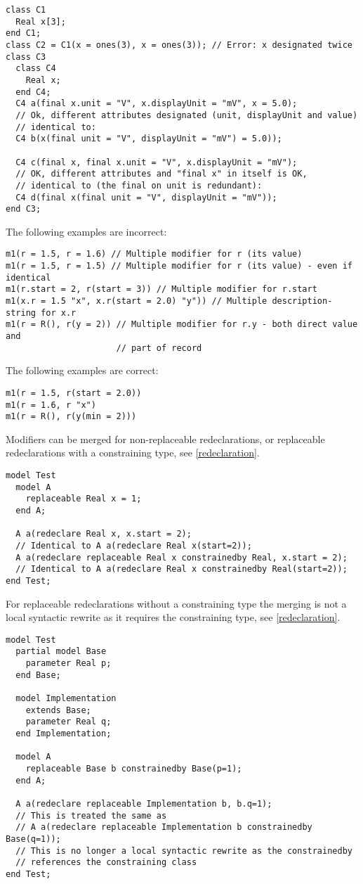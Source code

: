 \begin{example}
\begin{lstlisting}[language=modelica]
class C1
  Real x[3];
end C1;
class C2 = C1(x = ones(3), x = ones(3)); // Error: x designated twice
class C3
  class C4
    Real x;
  end C4;
  C4 a(final x.unit = "V", x.displayUnit = "mV", x = 5.0);
  // Ok, different attributes designated (unit, displayUnit and value)
  // identical to:
  C4 b(x(final unit = "V", displayUnit = "mV") = 5.0));

  C4 c(final x, final x.unit = "V", x.displayUnit = "mV");
  // OK, different attributes and "final x" in itself is OK,
  // identical to (the final on unit is redundant):
  C4 d(final x(final unit = "V", displayUnit = "mV"));
end C3;
\end{lstlisting}

The following examples are incorrect:
\begin{lstlisting}[language=modelica]
m1(r = 1.5, r = 1.6) // Multiple modifier for r (its value)
m1(r = 1.5, r = 1.5) // Multiple modifier for r (its value) - even if identical
m1(r.start = 2, r(start = 3)) // Multiple modifier for r.start
m1(x.r = 1.5 "x", x.r(start = 2.0) "y")) // Multiple description-string for x.r
m1(r = R(), r(y = 2)) // Multiple modifier for r.y - both direct value and
                      // part of record
\end{lstlisting}
The following examples are correct:
\begin{lstlisting}[language=modelica]
m1(r = 1.5, r(start = 2.0))
m1(r = 1.6, r "x")
m1(r = R(), r(y(min = 2)))
\end{lstlisting}

Modifiers can be merged for non-replaceable redeclarations, or replaceable redeclarations with a constraining type, see \cref{redeclaration}.
\begin{lstlisting}[language=modelica]
model Test
  model A
    replaceable Real x = 1;
  end A;

  A a(redeclare Real x, x.start = 2);
  // Identical to A a(redeclare Real x(start=2));
  A a(redeclare replaceable Real x constrainedby Real, x.start = 2);
  // Identical to A a(redeclare Real x constrainedby Real(start=2));
end Test;
\end{lstlisting}

For replaceable redeclarations without a constraining type the merging is not a local syntactic rewrite as it requires the constraining type, see \cref{redeclaration}.
\begin{lstlisting}[language=modelica]
model Test
  partial model Base
    parameter Real p;
  end Base;

  model Implementation
    extends Base;
    parameter Real q;
  end Implementation;

  model A
    replaceable Base b constrainedby Base(p=1);
  end A;

  A a(redeclare replaceable Implementation b, b.q=1);
  // This is treated the same as
  // A a(redeclare replaceable Implementation b constrainedby Base(q=1));
  // This is no longer a local syntactic rewrite as the constrainedby
  // references the constraining class
end Test;
\end{lstlisting}
\end{example}


